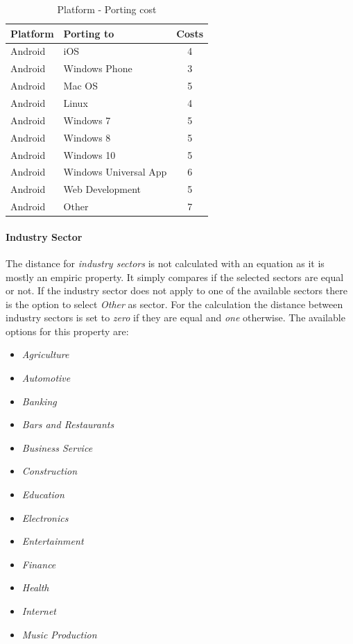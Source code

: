 \begin{table}[h]
	\centering 
	\setlength{\tabcolsep}{4pt}
	\begin{tabular}{|l|l|c|}\hline
		Platform			& Porting to 	&  Costs 	\\ \hline
		Android   			& iOS					& 4      		\\ \hline
		Android   			& Windows Phone 		& 3      		\\ \hline
		Android   			& Mac OS 				& 5     		\\ \hline
		Android   			& Linux 				& 4     		\\ \hline
		Android  			& Windows 7 			& 5     		\\ \hline
		Android  			& Windows 8				& 5     		\\ \hline
		Android  			& Windows 10 			& 5     		\\ \hline
		Android  			& Windows Universal App	& 6     		\\ \hline
		Android  			& Web Development 		& 5     		\\ \hline
		Android  			& Other 				& 7     		\\ \hline
	\end{tabular} 
	\caption{Platform - Porting cost} 
	\label{property:platform} 
\end{table}

\paragraph*{\textbf{Industry Sector}}
The distance for \textit{industry sectors} is not calculated with an equation as it is mostly an empiric property. It simply compares if the selected sectors are equal or not. If the industry sector does not apply to one of the available sectors there is the option to select \textit{Other} as sector. For the calculation the distance between industry sectors is set to \textit{zero} if they are equal and  \textit{one} otherwise. The available options for this property are:
\begin{itemize}
	\item \textit{Agriculture}
	\item \textit{Automotive}
	\item \textit{Banking}
	\item \textit{Bars and Restaurants}
	\item \textit{Business Service}
	\item \textit{Construction}
	\item \textit{Education}
	\item \textit{Electronics}
	\item \textit{Entertainment}
	\item \textit{Finance}
	\item \textit{Health}
	\item \textit{Internet}
	\item \textit{Music Production}
\end{itemize}

